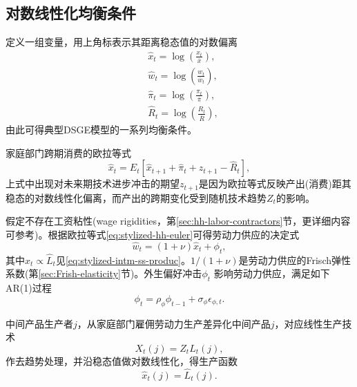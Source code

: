 \subsection{对数线性化均衡条件}
\label{sec:stylized-loglin-equilibra}

定义一组变量，用上角标表示其距离稳态值的对数偏离
\begin{equation}
  \label{eq:stylized-deviation}
  \begin{split}
    & \hat{x}_{t} = \log \left( \frac{x_{t}}{\overline{x}} \right), \\
    & \hat{w}_{t} = \log \left( \frac{w_{t}}{\overline{w}_{t}} \right), \\
    & \hat{\pi}_{t} = \log \left( \frac{\pi_{t}}{\overline{\pi}} \right), \\
    & \hat{R}_{t} = \log \left( \frac{R_{t}}{\overline{R}} \right),
  \end{split}
\end{equation}
由此可得典型DSGE模型的一系列均衡条件。

家庭部门跨期消费的欧拉等式
\begin{equation}
  \label{eq:stylized-hh-euler}
  \hat{x}_{t} = E_{t} \left[
  \hat{x}_{t+1}  + \hat{\pi}_{t} + z_{t+1} - \hat{R}_{t}
  \right],
\end{equation}
上式中出现对未来期技术进步冲击的期望$z_{t+1}$是因为欧拉等式反映产出(消费)距其稳态的对数线性化偏离，而产出的跨期变化受到随机技术趋势$Z_{t}$的影响。

假定不存在工资粘性(wage rigidities，第\ref{sec:hh-labor-contractors}节，更详细内容可参考\cite{Erceg:2000dm})。根据欧拉等式\eqref{eq:stylized-hh-euler}可得劳动力供应的决定式
\begin{equation}
  \label{eq:stylized-labor-supply}
  \hat{w}_{t} = \left( 1 + \nu \right) \hat{x}_{t} + \phi_{t},
\end{equation}
其中$\hat{x}_{t} \propto \widehat{L}_{t}$见\eqref{eq:stylized-intm-ss-produc}。$1/\left( 1 + \nu \right)$是劳动力供应的Frisch弹性系数(第\ref{sec:Frish-elasticity}节)。外生偏好冲击$\phi_{t}$
影响劳动力供应，满足如下AR(1)过程
\begin{equation}
  \label{eq:stylized-preference-shock-process}
  \phi_{t} = \rho_{\phi} \phi_{t-1} + \sigma_{\phi} \epsilon_{\phi,t}.
\end{equation}

中间产品生产者$j$，从家庭部门雇佣劳动力生产差异化中间产品$j$，对应线性生产技术
\begin{equation}
  \label{eq:stylized-intm-production-function}
  X_{t}(j) = Z_{t} L_{t}(j),
\end{equation}
作去趋势处理，并沿稳态值做对数线性化，得生产函数
\begin{equation}
  \label{eq:stylized-intm-ss-produc}
  \hat{x}_{t}(j) = \hat{L}_{t}(j).
\end{equation}

